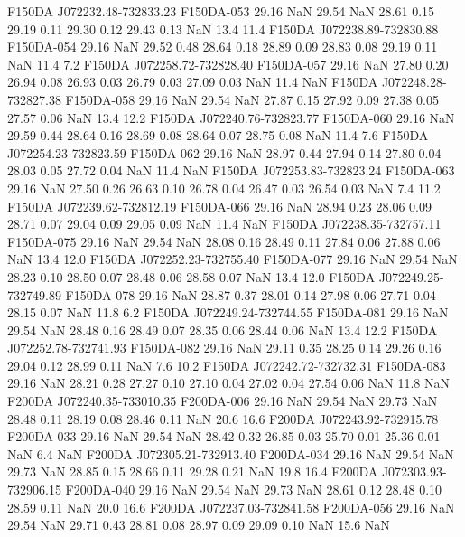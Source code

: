 F150DA J072232.48-732833.23   F150DA-053     29.16 NaN    29.54 NaN  28.61  0.15   29.19  0.11   29.30  0.12   29.43  0.13    NaN   13.4   11.4
F150DA J072238.89-732830.88   F150DA-054     29.16 NaN  29.52  0.48   28.64  0.18   28.89  0.09   28.83  0.08   29.19  0.11    NaN   11.4   7.2
F150DA J072258.72-732828.40   F150DA-057     29.16 NaN  27.80  0.20   26.94  0.08   26.93  0.03   26.79  0.03   27.09  0.03    NaN   11.4    NaN
F150DA J072248.28-732827.38   F150DA-058     29.16 NaN    29.54 NaN  27.87  0.15   27.92  0.09   27.38  0.05   27.57  0.06    NaN   13.4   12.2
F150DA J072240.76-732823.77   F150DA-060     29.16 NaN  29.59  0.44   28.64  0.16   28.69  0.08   28.64  0.07   28.75  0.08    NaN   11.4   7.6
F150DA J072254.23-732823.59   F150DA-062     29.16 NaN  28.97  0.44   27.94  0.14   27.80  0.04   28.03  0.05   27.72  0.04    NaN   11.4    NaN
F150DA J072253.83-732823.24   F150DA-063     29.16 NaN  27.50  0.26   26.63  0.10   26.78  0.04   26.47  0.03   26.54  0.03    NaN   7.4   11.2
F150DA J072239.62-732812.19   F150DA-066     29.16 NaN  28.94  0.23   28.06  0.09   28.71  0.07   29.04  0.09   29.05  0.09    NaN   11.4    NaN
F150DA J072238.35-732757.11   F150DA-075     29.16 NaN    29.54 NaN  28.08  0.16   28.49  0.11   27.84  0.06   27.88  0.06    NaN   13.4   12.0
F150DA J072252.23-732755.40   F150DA-077     29.16 NaN    29.54 NaN  28.23  0.10   28.50  0.07   28.48  0.06   28.58  0.07    NaN   13.4   12.0
F150DA J072249.25-732749.89   F150DA-078     29.16 NaN  28.87  0.37   28.01  0.14   27.98  0.06   27.71  0.04   28.15  0.07    NaN   11.8   6.2
F150DA J072249.24-732744.55   F150DA-081     29.16 NaN    29.54 NaN  28.48  0.16   28.49  0.07   28.35  0.06   28.44  0.06    NaN   13.4   12.2
F150DA J072252.78-732741.93   F150DA-082     29.16 NaN  29.11  0.35   28.25  0.14   29.26  0.16   29.04  0.12   28.99  0.11    NaN   7.6   10.2
F150DA J072242.72-732732.31   F150DA-083     29.16 NaN  28.21  0.28   27.27  0.10   27.10  0.04   27.02  0.04   27.54  0.06    NaN   11.8    NaN
F200DA J072240.35-733010.35   F200DA-006     29.16 NaN    29.54 NaN    29.73 NaN  28.48  0.11   28.19  0.08   28.46  0.11    NaN   20.6   16.6
F200DA J072243.92-732915.78   F200DA-033     29.16 NaN    29.54 NaN   28.42  0.32   26.85  0.03   25.70  0.01   25.36  0.01    NaN   6.4    NaN
F200DA J072305.21-732913.40   F200DA-034     29.16 NaN    29.54 NaN    29.73 NaN  28.85  0.15   28.66  0.11   29.28  0.21    NaN   19.8   16.4
F200DA J072303.93-732906.15   F200DA-040     29.16 NaN    29.54 NaN    29.73 NaN  28.61  0.12   28.48  0.10   28.59  0.11    NaN   20.0   16.6
F200DA J072237.03-732841.58   F200DA-056     29.16 NaN    29.54 NaN  29.71  0.43   28.81  0.08   28.97  0.09   29.09  0.10    NaN   15.6    NaN
